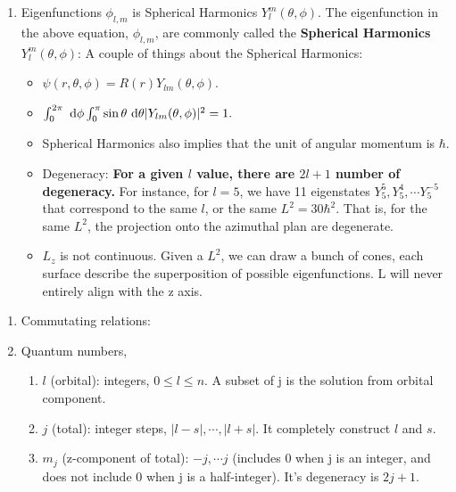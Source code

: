 \documentclass{school-22.101-notes}
\begin{document}
\begin{enumerate}
\item Eigenfunctions $\phi_{l,m}$ is Spherical Harmonics $Y_l^m(\theta, \phi)$. 
The eigenfunction in the above equation, $\phi_{l,m}$, are commonly called the \textbf{Spherical Harmonics $Y_l^m (\theta, \phi)$}:
A couple of things about the Spherical Harmonics:
\begin{itemize}
\item $\psi( r, \theta, \phi) = R(r) Y_{lm} (\theta, \phi)$. 
\item $\int_0^{2\pi} \mbox{ }\mathrm{d} \phi \int_0^{\pi} \sin \theta \mbox{ }\mathrm{d} \theta |Y_{lm} (\theta, \phi) |^2 = 1.$
\item Spherical Harmonics also implies that the unit of angular momentum is $\hbar$.
\item Degeneracy: \textbf{For a given $l$ value, there are $2l+1$ number of degeneracy.} For instance, for $l=5$, we have 11 eigenstates $Y_5^5, Y_5^4, \cdots Y_5^{-5}$ that correspond to the same $l$, or the same $L^2 = 30 \hbar^2$. That is, for the same $L^2$, the projection onto the azimuthal plan are degenerate.  
\item $L_z$ is not continuous. Given a $L^2$, we can draw a bunch of cones, each surface describe the superposition of possible eigenfunctions. L will never entirely align with the z axis. 
\end{itemize}
\end{enumerate}


\begin{enumerate}
\item Commutating relations: 

\item Quantum numbers, 
\begin{enumerate}
\item $l$ (orbital): integers, $0 \le l \le n$. A subset of j is the solution from orbital component. 
\item $j$ (total): integer steps, $|l-s|, \cdots, |l+s|$. It completely construct $l$ and $s$. 
\item $m_j$ (z-component of total): $-j, \cdots j$ (includes 0 when j is an integer, and does not include 0 when j is a half-integer). It's degeneracy is $2j+1$. 
\end{enumerate}
\end{enumerate}
\end{document}

